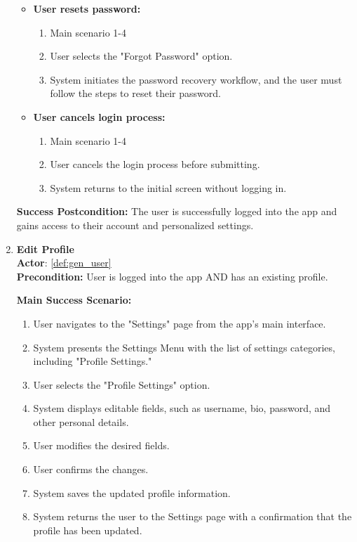 \documentclass{article}
\begin{document}
\begin{enumerate}[label=\textbf{UC\arabic*}]
\begin{itemize}
              \item[{}] \textbf{User resets password:}
                    \begin{enumerate}[label=\textbf{\arabic*.}]
                        \item Main scenario 1-4
                        \item User selects the "Forgot Password" option.
                        \item System initiates the password recovery workflow, and the user must follow the steps to reset their password.
                    \end{enumerate}

              \item[{}] \textbf{User cancels login process:}
                    \begin{enumerate}[label=\textbf{\arabic*.}]
                        \item Main scenario 1-4
                        \item User cancels the login process before submitting.
                        \item System returns to the initial screen without logging in.
                    \end{enumerate}
          \end{itemize}

          \textbf{Success Postcondition:} The user is successfully logged into the app and gains access to their account and personalized settings.

    \item \label{uc:25} \textbf{Edit Profile} \\
          \textbf{Actor}: \ref{def:gen_user} \\
          \textbf{Precondition:} User is logged into the app AND has an existing profile.

          \textbf{Main Success Scenario:}
          \begin{enumerate}[label=\textbf{\arabic*.}]
              \item User navigates to the "Settings" page from the app’s main interface.
              \item System presents the Settings Menu with the list of settings categories, including "Profile Settings."
              \item User selects the "Profile Settings" option.
              \item System displays editable fields, such as username, bio, password, and other personal details.
              \item User modifies the desired fields.
              \item User confirms the changes.
              \item System saves the updated profile information.
              \item System returns the user to the Settings page with a confirmation that the profile has been updated.
          \end{enumerate}


\end{enumerate}
\end{document}
